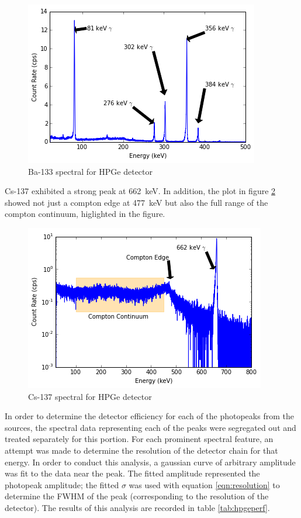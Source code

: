 \documentclass[12pt]{article}
\begin{document}
\begin{center}
\begin{figure}
	\includegraphics{hpge_ba133}
	\caption{Ba-133 spectral for HPGe detector}
	\label{fig:ba133hpge}
\end{figure}
\end{center}

Cs-137 exhibited a strong peak at \SI{662}{\kilo\electronvolt}. In addition, the plot in figure \ref{fig:cs137hpge} showed not just a compton edge at \SI{477}{\kilo\electronvolt} but also the full range of the compton continuum, higlighted in the figure.

\begin{center}
\begin{figure}
	\includegraphics{hpge_cs137}
	\caption{Cs-137 spectral for HPGe detector}
	\label{fig:cs137hpge}
\end{figure}
\end{center}

In order to determine the detector efficiency for each of the photopeaks from the sources, the spectral data representing each of the peaks were segregated out and treated separately for this portion. For each prominent spectral feature, an attempt was made to determine the resolution of the detector chain for that energy. In order to conduct this analysis, a gaussian curve of arbitrary amplitude was fit to the data near the peak. The fitted amplitude represented the photopeak amplitude; the fitted $\sigma$ was used with equation \ref{eqn:resolution} \cite{textbook} to determine the FWHM of the peak (corresponding to the resolution of the detector). The results of this analysis are recorded in table \ref{tab:hpgeperf}.
\end{document}

